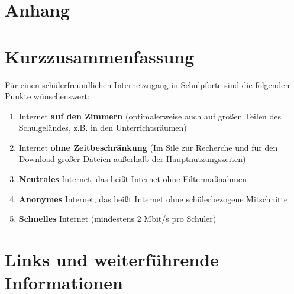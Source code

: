 \documentclass[10pt,a4paper,notitlepage]{scrartcl}
\begin{document}
\newpage\appendix
\section*{\huge Anhang}
\section{Kurzzusammenfassung}
Für einen schülerfreundlichen Internetzugang in Schulpforte sind die folgenden Punkte wünschenswert:
\begin{enumerate}
\item Internet \textbf{auf den Zimmern} (optimalerweise auch auf großen Teilen des Schulgeländes, z.B. in den Unterrichtsräumen)
\item Internet \textbf{ohne Zeitbeschränkung} (Im Sile zur Recherche und für den Download großer Dateien außerhalb der Hauptnutzungszeiten)
\item \textbf{Neutrales} Internet, das heißt Internet ohne Filtermaßnahmen
\item \textbf{Anonymes} Internet, das heißt Internet ohne schülerbezogene Mitschnitte
\item \textbf{Schnelles} Internet (mindestens 2 Mbit/s pro Schüler)
\end{enumerate}

\section{Links und weiterführende Informationen}
\vspace{-1.5cm}
\nocite{*}

\renewcommand{\refname}{}

\bigskip
\end{document}
